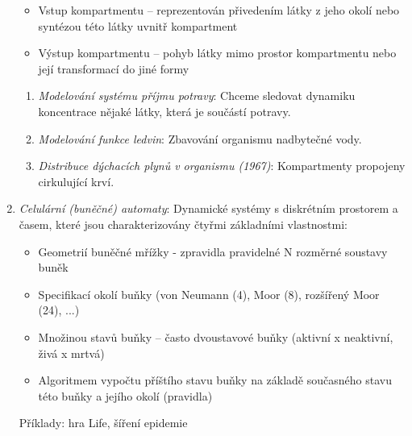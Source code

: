 \begin{enumerate}[label=(\alph*)]
\begin{itemize}
\item Vstup kompartmentu – reprezentován přivedením látky z jeho okolí nebo syntézou této látky uvnitř kompartment
\item Výstup kompartmentu – pohyb látky mimo prostor kompartmentu nebo její transformací do jiné formy
\end{itemize}
\begin{enumerate}[label=(\roman*)]
\item \textit{Modelování systému příjmu potravy}: Chceme sledovat dynamiku koncentrace nějaké látky, která je součástí potravy.
\item \textit{Modelování funkce ledvin}: Zbavování organismu nadbytečné vody.
\item \textit{Distribuce dýchacích plynů v organismu (1967)}: Kompartmenty propojeny cirkulující krví. 
\end{enumerate}
\item \textit{Celulární (buněčné) automaty}: Dynamické systémy s diskrétním prostorem a časem, které jsou charakterizovány čtyřmi základními vlastnostmi:
\begin{itemize}
\item Geometrií buněčné mřížky - zpravidla pravidelné N rozměrné soustavy buněk
\item Specifikací okolí buňky (von Neumann (4), Moor (8), rozšířený Moor (24), ...)
\item Množinou stavů buňky – často dvoustavové buňky (aktivní x neaktivní, živá x mrtvá)
\item Algoritmem vypočtu příštího stavu buňky na základě současného stavu této buňky a jejího okolí (pravidla)
\end{itemize}
Příklady: hra Life, šíření epidemie
\end{enumerate}

